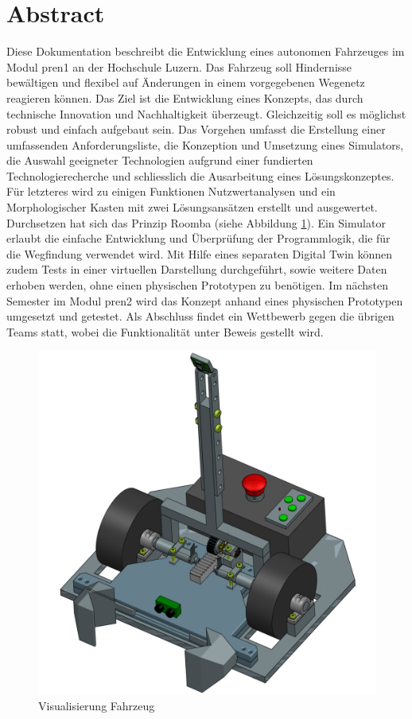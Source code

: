 \newpage
\section{Abstract}

Diese Dokumentation beschreibt die Entwicklung eines autonomen Fahrzeuges im Modul \acrfull{pren1} an der Hochschule Luzern. Das Fahrzeug soll Hindernisse bewältigen und flexibel auf Änderungen in einem vorgegebenen Wegenetz reagieren können. Das Ziel ist die Entwicklung eines Konzepts, das durch technische Innovation und Nachhaltigkeit überzeugt. Gleichzeitig soll es möglichst robust und einfach aufgebaut sein.
Das Vorgehen umfasst die Erstellung einer umfassenden Anforderungsliste, die Konzeption und Umsetzung eines Simulators, die Auswahl geeigneter Technologien aufgrund einer fundierten Technologierecherche und schliesslich die Ausarbeitung eines Lösungskonzeptes. Für letzteres wird zu einigen Funktionen Nutzwertanalysen und ein Morphologischer Kasten mit zwei Lösungsansätzen erstellt und ausgewertet. Durchsetzen hat sich das Prinzip Roomba (siehe Abbildung \ref{img:Visualisierung Fahrzeug}). Ein Simulator erlaubt die einfache Entwicklung und Überprüfung der Programmlogik, die für die Wegfindung verwendet wird. Mit Hilfe eines separaten Digital Twin können zudem Tests in einer virtuellen Darstellung durchgeführt, sowie weitere Daten erhoben werden, ohne einen physischen Prototypen zu benötigen. 
Im nächsten Semester im Modul \acrshort{pren2} wird das Konzept anhand eines physischen Prototypen umgesetzt und getestet. Als Abschluss findet ein Wettbewerb gegen die übrigen Teams statt, wobei die Funktionalität unter Beweis gestellt wird.

\begin{figure}[H] %
    \centering
        \includegraphics[width=0.6\linewidth]       {Skizze_Fahrzeug.png}               \caption[Visualisierung Fahrzeug]
        {Visualisierung Fahrzeug}
        
        \label{img:Visualisierung Fahrzeug}
    \end{figure} 